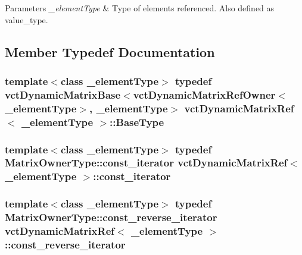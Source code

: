 \begin{DoxyParams}{Parameters}
{\em \-\_\-element\-Type} & Type of elements referenced. Also defined as {\ttfamily value\-\_\-type}. \\
\hline
\end{DoxyParams}


\subsection{Member Typedef Documentation}
\hypertarget{classvct_dynamic_matrix_ref_a043cfda592e3e7fbca034c09aed3438b}{
\subsubsection[{Base\-Type}]{\setlength{\rightskip}{0pt plus 5cm}template$<$class \-\_\-element\-Type$>$ typedef {\bf vct\-Dynamic\-Matrix\-Base}$<${\bf vct\-Dynamic\-Matrix\-Ref\-Owner}$<$\-\_\-element\-Type$>$, \-\_\-element\-Type$>$ {\bf vct\-Dynamic\-Matrix\-Ref}$<$ \-\_\-element\-Type $>$\-::{\bf Base\-Type}}}\label{classvct_dynamic_matrix_ref_a043cfda592e3e7fbca034c09aed3438b}
\hypertarget{classvct_dynamic_matrix_ref_a6a0340b4b42746edc27c8220cf44afd8}{
\subsubsection[{const\-\_\-iterator}]{\setlength{\rightskip}{0pt plus 5cm}template$<$class \-\_\-element\-Type$>$ typedef {\bf Matrix\-Owner\-Type\-::const\-\_\-iterator} {\bf vct\-Dynamic\-Matrix\-Ref}$<$ \-\_\-element\-Type $>$\-::{\bf const\-\_\-iterator}}}\label{classvct_dynamic_matrix_ref_a6a0340b4b42746edc27c8220cf44afd8}
\hypertarget{classvct_dynamic_matrix_ref_a6b38953e6bef46b68d3336829873f48e}{
\subsubsection[{const\-\_\-reverse\-\_\-iterator}]{\setlength{\rightskip}{0pt plus 5cm}template$<$class \-\_\-element\-Type$>$ typedef {\bf Matrix\-Owner\-Type\-::const\-\_\-reverse\-\_\-iterator} {\bf vct\-Dynamic\-Matrix\-Ref}$<$ \-\_\-element\-Type $>$\-::{\bf const\-\_\-reverse\-\_\-iterator}}}\label{classvct_dynamic_matrix_ref_a6b38953e6bef46b68d3336829873f48e}
